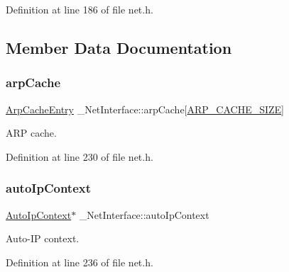 Definition at line 186 of file net.\+h.



\subsection{Member Data Documentation}
\mbox{\label{struct__NetInterface_a758b74913c8a9563dda1a6cb8823ce15}} 
\subsubsection{\texorpdfstring{arp\+Cache}{arpCache}}
{\footnotesize\ttfamily \hyperlink{structArpCacheEntry}{Arp\+Cache\+Entry} \+\_\+\+Net\+Interface\+::arp\+Cache\mbox{[}\hyperlink{net__config_8h_adfc3bb356b0ae1244f95c2f191ee096e}{A\+R\+P\+\_\+\+C\+A\+C\+H\+E\+\_\+\+S\+I\+ZE}\mbox{]}}



A\+RP cache. 



Definition at line 230 of file net.\+h.

\mbox{\label{struct__NetInterface_a706b2cf07ad2d4256984d454e6e4bb45}} 
\subsubsection{\texorpdfstring{auto\+Ip\+Context}{autoIpContext}}
{\footnotesize\ttfamily \hyperlink{auto__ip_8h_aa1164cc1ba77c262d41deb99cb704cc2}{Auto\+Ip\+Context}$\ast$ \+\_\+\+Net\+Interface\+::auto\+Ip\+Context}



Auto-\/\+IP context. 



Definition at line 236 of file net.\+h.

\mbox{\label{struct__NetInterface_ab005a383341bb6e1882644a23613c0b6}} 
